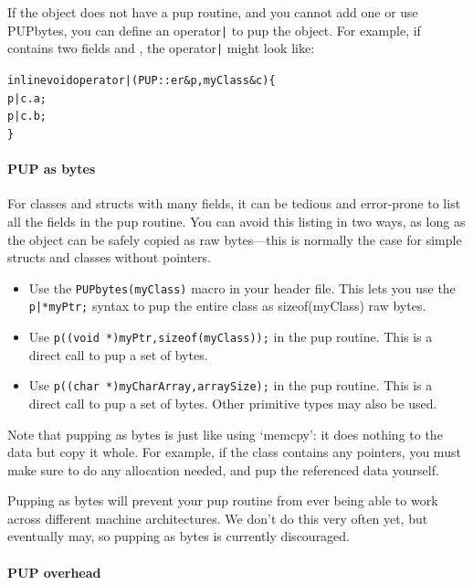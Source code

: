 If the object does not have a pup routine, and you cannot add one or use 
PUPbytes, you can define an operator\verb.|. to pup the object.
For example, if  contains two fields  and , the 
operator\verb.|. might look like:

\begin{alltt}
  inline void operator|(PUP::er &p,myClass &c) \{
    p|c.a;
    p|c.b;
  \}
\end{alltt}


\paragraph{PUP as bytes}

\label{sec:pupbytes}

For classes and structs with many fields, it can be tedious and 
error-prone to list all the fields in the pup routine.
You can avoid this listing in two ways, as long as the
object can be safely copied as raw bytes---this is normally 
the case for simple structs and classes without pointers.

\begin{itemize}
\item Use the \verb.PUPbytes(myClass). macro in your header file.
      This lets you use the \verb.p|*myPtr;. syntax 
      to pup the entire class as sizeof(myClass) raw bytes.

\item Use \verb.p((void *)myPtr,sizeof(myClass));. in the pup 
      routine.  This is a direct call to pup a set of bytes. 
      
\item Use \verb.p((char *)myCharArray,arraySize);. in the pup 
      routine.  This is a direct call to pup a set of bytes. 
	  Other primitive types may also be used.
      
\end{itemize}

Note that pupping as bytes is just like using `memcpy': 
it does nothing to the data but copy it whole.
For example, if the class contains any pointers, you
must make sure to do any allocation needed, and
pup the referenced data yourself.

Pupping as bytes will prevent your pup routine from 
ever being able to work across different machine 
architectures.  We don't do this very often yet, but 
eventually may, so pupping as bytes is currently discouraged.



\paragraph{PUP overhead}

